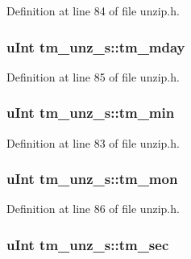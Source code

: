 Definition at line 84 of file unzip.\+h.

\hypertarget{structtm__unz__s_a51ed1873e1dcabf08ff0f85caf8aefee}{
\subsubsection[{tm\+\_\+mday}]{\setlength{\rightskip}{0pt plus 5cm}u\+Int tm\+\_\+unz\+\_\+s\+::tm\+\_\+mday}}\label{structtm__unz__s_a51ed1873e1dcabf08ff0f85caf8aefee}


Definition at line 85 of file unzip.\+h.

\hypertarget{structtm__unz__s_ac5a6bf08a4c5db8ae2243d4f0c35b192}{
\subsubsection[{tm\+\_\+min}]{\setlength{\rightskip}{0pt plus 5cm}u\+Int tm\+\_\+unz\+\_\+s\+::tm\+\_\+min}}\label{structtm__unz__s_ac5a6bf08a4c5db8ae2243d4f0c35b192}


Definition at line 83 of file unzip.\+h.

\hypertarget{structtm__unz__s_a4f5e461d8cad18d1aff7ec012168111d}{
\subsubsection[{tm\+\_\+mon}]{\setlength{\rightskip}{0pt plus 5cm}u\+Int tm\+\_\+unz\+\_\+s\+::tm\+\_\+mon}}\label{structtm__unz__s_a4f5e461d8cad18d1aff7ec012168111d}


Definition at line 86 of file unzip.\+h.

\hypertarget{structtm__unz__s_ab91e69a9869e5db5be51b1aebaa5ea0d}{
\subsubsection[{tm\+\_\+sec}]{\setlength{\rightskip}{0pt plus 5cm}u\+Int tm\+\_\+unz\+\_\+s\+::tm\+\_\+sec}}\label{structtm__unz__s_ab91e69a9869e5db5be51b1aebaa5ea0d}


